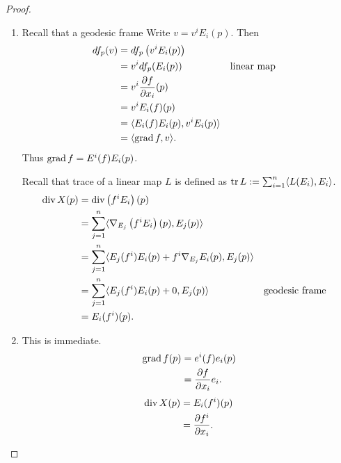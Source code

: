 \documentclass[12pt]{article}
\begin{document}
\begin{proof}
\begin{enumerate}[label=(\alph*)]
	\item Recall that a geodesic frame  Write $ v = v^{i} E_i(p)$. Then
	\begin{align*}
		df_p(v) &= df_p\left( v^{i} E_i(p) \right)  \\
			&= v^{i} df_p(E_i(p))  && \text{linear map}  \\
		&= v^{i} \frac{\partial f}{\partial x_i}(p) \\
		&= v^{i} E_i(f) (p) \\
		&= \langle E_i(f) E_i(p), v^{i} E_i(p) \rangle \\
		&= \langle \operatorname{grad} f, v \rangle .
	\end{align*}
	Thus $ \operatorname{grad} f = E^{i}(f) E_i(p)$.

	Recall that trace of a linear map $ L$ is defined as $ \operatorname{tr} L := \sum_{ i= 1}^{ n}  \langle L(E_i), E_i \rangle$.
	\begin{align*}
		\operatorname{div} X(p) &= \operatorname{div} \left( f^{i} E_i \right)(p)  \\
		&= \sum_{ j= 1}^{ n}  \langle \nabla _{E_j} \left( f^{i} E_i \right)(p)  , E_j(p)  \rangle \\
		&= \sum_{j= 1}^{ n}  \langle E_j(f^{i})E_i(p) + f^{i}\nabla_{E_j} E_i(p), E_j(p) \rangle\\
		&= \sum_{ j=1}^{ n}  \langle E_j(f^{i})E_i(p) + 0, E_j(p) \rangle && \text{geodesic frame} \\
		&=  E_i(f^{i})(p) .
	\end{align*}
\item This is immediate.
\begin{align*}
	\operatorname{grad} f(p) &= e^{i}(f) e_i(p) \\
	&= \frac{\partial f}{\partial x_i} e_i  .
\end{align*}
\begin{align*}
	\operatorname{div} X (p) &= E_i(f^{i}) (p) \\
	&= \frac{\partial f^{i}}{\partial x_i}   .
\end{align*}
\end{enumerate}
\end{proof}
\end{document}
